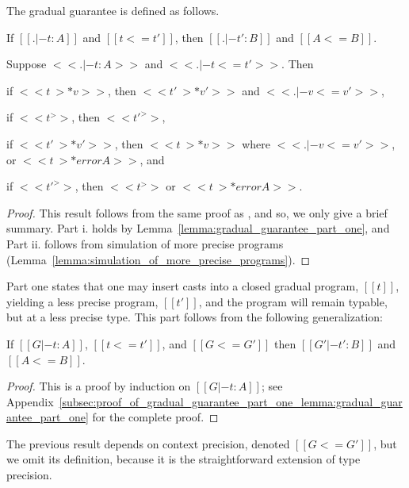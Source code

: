 The gradual guarantee is defined as follows.
\begin{theorem}
  \label{thm:gradual_guarantee} 
  \begin{enumR}
  \item If $[[. |- t : A]]$ and $[[t <= t']]$, then $[[. |- t' : B]]$ and $[[A <= B]]$.
  \item Suppose $<<. |- t : A>>$ and $<<. |- t <= t'>>$. Then
    \begin{enumA}
    \item if $<<t ~>* v>>$, then $<<t' ~>* v'>>$ and $<<. |- v <= v'>>$,
    \item if $<<t ^>>$, then $<<t' ^>>$,
    \item if $<<t' ~>* v'>>$, then $<<t ~>* v>>$ where $<<. |- v <= v'>>$, or $<<t ~>* error A>>$, and
    \item if $<<t' ^>>$, then $<<t ^>>$ or $<<t ~>* error A>>$.
    \end{enumA}
  \end{enumR}
\end{theorem}
\begin{proof}
  This result follows from the same proof as \cite{Siek:2015}, and so,
  we only give a brief summary.  Part i. holds by
  Lemma~\ref{lemma:gradual_guarantee_part_one}, and Part ii. follows
  from simulation of more precise programs
  (Lemma~\ref{lemma:simulation_of_more_precise_programs}).
\end{proof}
Part one states that one may insert casts into a closed gradual
program, $[[t]]$, yielding a less precise program, $[[t']]$, and the
program will remain typable, but at a less precise type.  This part
follows from the following generalization:
\begin{lemma}
  \label{lemma:gradual_guarantee_part_one}
  If $[[G |- t : A]]$, $[[t <= t']]$, and $[[G <= G']]$ then $[[G' |- t' : B]]$ and $[[A <= B]]$.
\end{lemma}
\begin{proof}
  This is a proof by induction on $[[G |- t : A]]$; see
  Appendix~\ref{subsec:proof_of_gradual_guarantee_part_one_lemma:gradual_guarantee_part_one}
  for the complete proof.
\end{proof}
The previous result depends on context precision, denoted $[[G <=
    G']]$, but we omit its definition, because it is the
straightforward extension of type precision.

